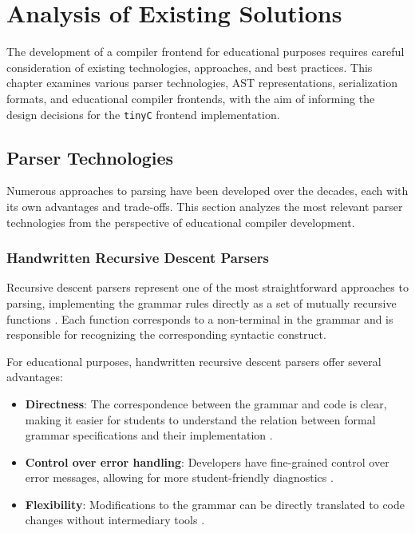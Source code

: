 \chapter{Analysis of Existing Solutions}

The development of a compiler frontend for educational purposes requires careful consideration of existing technologies, approaches, and best practices. This chapter examines various parser technologies, AST representations, serialization formats, and educational compiler frontends, with the aim of informing the design decisions for the \texttt{tinyC} frontend implementation.

\section{Parser Technologies}

Numerous approaches to parsing have been developed over the decades, each with its own advantages and trade-offs. This section analyzes the most relevant parser technologies from the perspective of educational compiler development.

\subsection{Handwritten Recursive Descent Parsers}

Recursive descent parsers represent one of the most straightforward approaches to parsing, implementing the grammar rules directly as a set of mutually recursive functions \cite{aho2007compilers}. Each function corresponds to a non-terminal in the grammar and is responsible for recognizing the corresponding syntactic construct.

For educational purposes, handwritten recursive descent parsers offer several advantages:

\begin{itemize}
    \item \textbf{Directness}: The correspondence between the grammar and code is clear, making it easier for students to understand the relation between formal grammar specifications and their implementation \cite{parr2010language}.
    \item \textbf{Control over error handling}: Developers have fine-grained control over error messages, allowing for more student-friendly diagnostics \cite{holub1990compiler}.
    \item \textbf{Flexibility}: Modifications to the grammar can be directly translated to code changes without intermediary tools \cite{grune2012modern}.
\end{itemize}


